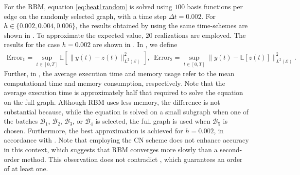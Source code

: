 \documentclass[10pt,a4paper]{amsart}
\begin{document}
For the RBM, equation \eqref{eq:heat1random} is solved using $100$ basis functions per edge on the randomly selected graph, with a time step $\Delta t = 0.002$. For $h\in\{0.002,0.004,0.006\}$, the results obtained by using the same time-schemes are shown in . To approximate the expected value, $20$ realizations are employed. The results for the case $h=0.002$ are shown in . In , we define
\begin{align}\label{eq:definition_error}
    \text{Error}_1 = \sup_{t\in [0,T]} \mathbb{E}\left[\|y(t)-z(t)\|^2_{L^2(\mathcal{E})}\right],\,\,\, \text{Error}_2 = \sup_{t\in [0,T]} \|y(t)-\mathbb{E}\left[z(t)\right]\|^2_{L^2(\mathcal{E})}.
\end{align}
Further, in , the average execution time and memory usage refer to the mean computational time and memory consumption, respectively. Note that the average execution time is approximately half that required to solve the equation on the full graph. Although RBM uses less memory, the difference is not substantial because, while the equation is solved on a small subgraph when one of the batches $\mathcal{B}_1$, $\mathcal{B}_2$, $\mathcal{B}_3$, or $\mathcal{B}_4$ is selected, the full graph is used when $\mathcal{B}_5$ is chosen. Furthermore, the best approximation is achieved for $h=0.002$, in accordance with . Note that employing the CN scheme does not enhance accuracy in this context, which suggests that RBM converges more slowly than a second-order method. This observation does not contradict , which guarantees an order of at least one.
\end{document}
